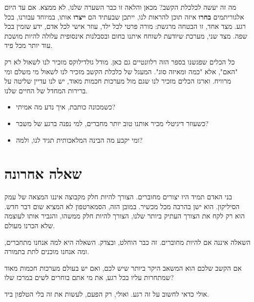 מה זה יעשה לכלכלת הקשב? מכאן והלאה זו כבר השערה שלנו, לא ממצא. אם עד היום אלגוריתמים \textbf{בחרו} איזה תוכן להראות לנו, ייתכן שבעתיד הם \textbf{ייצרו} אותו, במיוחד עבורנו, בכל רגע. מצד אחד, זו הבטחה מרגשת: מורה פרטי לכל ילד, עוזר אישי לכל אדם, ידע שזמין בכל שפה. מצד שני, מערכת שיודעת לשוחח איתנו בחום ובסבלנות אינסופית עלולה להיות מושכת עוד יותר מכל פיד.

כל הכלים שפגשנו בספר הזה רלוונטיים גם כאן. מודל גולדילוקס מזכיר לנו לשאול לא רק "האם", אלא "כמה ומאיזה סוג". המעגל של כלכלת הקשב מזכיר לנו לשאול מי משלם ומי מרוויח. וארגז הכלים מזכיר לנו שגם מול מערכות חכמות מאוד, יש לנו עדיין שליטה על ברירות המחדל של החיים שלנו.

\begin{alertbox}
\begin{itemize}
  \item כשמכונה כותבת, איך נדע מה אמיתי?
  \item כשעוזר דיגיטלי מכיר אותנו טוב יותר מחברים, למי נפנה ברגע של משבר?
  \item ומי יקבע מה הבינה המלאכותית תגיד לנו, ולמה?
\end{itemize}
\end{alertbox}

\section{שאלה אחרונה}

בני האדם תמיד היו יצורים מחוברים. הצורך להיות חלק מקבוצה איננו המצאה של עמק הסיליקון. הוא ישן בהרבה מכל מכשיר. במובן הזה, הסמארטפון לא המציא שום דבר חדש. הוא רק לקח את הצורך העתיק ביותר שלנו, הצורך להיות חלק ממשהו, והגביר אותו לעוצמה שלא הכרנו מעולם.

השאלה איננה אם להיות מחוברים. זה כבר הוחלט, ובצדק. השאלה היא למה אנחנו מתחברים, ומה אנחנו מוכנים לתת בתמורה.

\begin{thinkbox}
אם הקשב שלכם הוא המשאב היקר ביותר שיש לכם, ואם יש בעולם מערכות חכמות מאוד שמתחרות עליו בכל רגע, את מי אתם בוחרים לשים במרכז שלו?
\end{thinkbox}

אולי כדאי לחשוב על זה רגע. ואולי, רק הפעם, לעשות את זה בלי הטלפון ביד.
